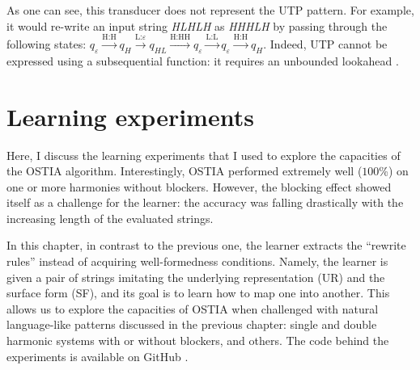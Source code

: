 As one can see, this transducer does not represent the UTP pattern.
For example, it would re-write an input string \emph{HLHLH} as \emph{HHHLH} by passing through the following states: $q_{\varepsilon}\xrightarrow{\text{H:H}}q_{H}\xrightarrow{\text{L:$\varepsilon$}}q_{HL}\xrightarrow{\text{H:HH}}q_{\varepsilon}\xrightarrow{\text{L:L}}q_{\varepsilon}\xrightarrow{\text{H:H}}q_{H}$.
Indeed, UTP cannot be expressed using a subsequential function: it requires an unbounded lookahead \citep{Jardine2016}.


\section{Learning experiments}
\label{learningexperiments}

Here, I discuss the learning experiments that I used to explore the capacities of the OSTIA algorithm.
Interestingly, OSTIA performed extremely well ($100$\%) on one or more harmonies without blockers.
However, the blocking effect showed itself as a challenge for the learner: the accuracy was falling drastically with the increasing length of the evaluated strings.

In this chapter, in contrast to the previous one, the learner extracts the ``rewrite rules'' instead of acquiring well-formedness conditions.
Namely, the learner is given a pair of strings imitating the underlying representation (UR) and the surface form (SF), and its goal is to learn how to map one into another.
This allows us to explore the capacities of OSTIA when challenged with natural language-like patterns discussed in the previous chapter: single and double harmonic systems with or without blockers, and others.
The code behind the experiments is available on GitHub \href{https://github.com/alenaks/subregular-experiments}{\faGithub} \citep{GHsubex}.

